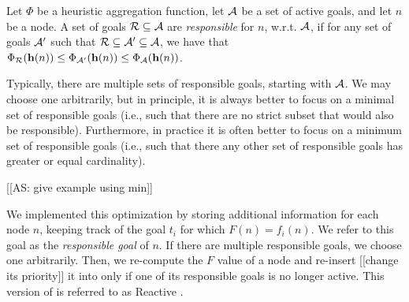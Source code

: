 \begin{definition}
Let $\Phi$ be a heuristic aggregation function, let $\mathcal{A}$ be a set of active goals, and let $n$ be a node.
A set of goals $\mathcal{R} \subseteq \mathcal{A}$ are \emph{responsible} for $n$, w.r.t. $\mathcal{A}$, if for any set of goals $\mathcal{A}'$ such that $\mathcal{R} \subseteq \mathcal{A}' \subseteq \mathcal{A}$, we have that $\Phi_{\mathcal{R}}(\mathbf{h}(n)) \leq \Phi_{\mathcal{A}'}(\mathbf{h}(n)) \leq \Phi_{\mathcal{A}}(\mathbf{h}(n))$.
\end{definition}

Typically, there are multiple sets of responsible goals, starting with $\mathcal{A}$.
We may choose one arbitrarily, but in principle, it is always better to focus on a minimal set of responsible goals (i.e., such that there are no strict subset that would also be responsible).
Furthermore, in practice it is often better to focus on a minimum set of responsible goals (i.e., such that there any other set of responsible goals has greater or equal cardinality).

[[AS: give example using min]]

We implemented this optimization by storing additional information for each node $n$, keeping track of the goal $t_i$ for which $F(n)=f_i(n)$.
We refer to this goal as the \emph{responsible goal} of $n$.
If there are multiple responsible goals, we choose one arbitrarily.
Then, we re-compute the $F$ value of a node and re-insert [[change its priority]] it into \open only if one of its responsible goals is no longer active.
This version of \kastarphi is referred to as Reactive \kastarphi.

